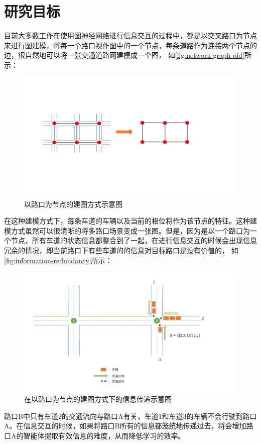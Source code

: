 \section{研究目标}
目前大多数工作在使用图神经网络进行信息交互的过程中，都是以交叉路口为节点来进行图建模，将每一个路口视作图中的一个节点，每条道路作为连接两个节点的边，很自然地可以将一张交通道路网建模成一个图， 如\autoref{fig:network-graph-old}所示：
\begin{figure}[htb]
  \includegraphics[width=1.2\textwidth]{ppt/network-graph.pdf}
  \caption{以路口为节点的建图方式示意图}
  \label{fig:network-graph-old}
\end{figure}
在这种建模方式下，每条车道的车辆以及当前的相位将作为该节点的特征。这种建模方式虽然可以很清晰的将多路口场景变成一张图。但是，因为是以一个路口为一个节点，所有车道的状态信息都整合到了一起，在进行信息交互的时候会出现信息冗余的情况，即当前路口下有些车道的的信息对目标路口是没有价值的，
如\autoref{fig:information-redundancy}所示：
\begin{figure}[htb]
  \includegraphics[width=1.2\textwidth]{ppt/information-redundancy.pdf}
  \caption{在以路口为节点的建图方式下的信息传递示意图}
  \label{fig:information-redundancy}
\end{figure}
路口B中只有车道2的交通流向与路口A有关，车道1和车道3的车辆不会行驶到路口A。在信息交互的时候，如果将路口B所有的信息都笼统地传递过去，将会增加路口A的智能体提取有效信息的难度，从而降低学习的效率。

